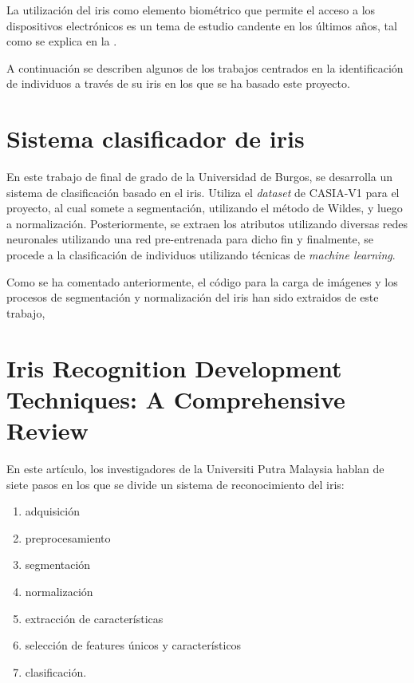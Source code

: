  \label{capitulo6}

La utilización del iris como elemento biométrico que permite el acceso a los dispositivos electrónicos es un tema de estudio candente en los últimos años, 
tal como se explica en la .

A continuación se describen algunos de los trabajos centrados en la identificación de individuos a través de su iris en los que se ha basado este proyecto.

\section{Sistema clasificador de iris}

En este trabajo de final de grado\cite{tfg_iris_2020} de la Universidad de Burgos, se desarrolla un sistema de clasificación basado en el iris. Utiliza el \textit{dataset} 
de CASIA-V1 para el proyecto, al cual somete a segmentación, utilizando el método de Wildes, y luego a normalización. Posteriormente, se extraen los atributos utilizando diversas redes 
neuronales utilizando una red pre-entrenada para dicho fin\cite{lozej_end--end_2018} y finalmente, se procede a la clasificación de individuos utilizando técnicas de \textit{machine learning}.

Como se ha comentado anteriormente, el código para la carga de imágenes y los procesos de segmentación y normalización del iris han sido extraidos de este trabajo,

\section{Iris Recognition Development Techniques: A Comprehensive Review}

En este artículo\cite{malgheet_iris_2021}, los investigadores de la Universiti Putra Malaysia hablan de siete pasos en los que se divide un sistema de reconocimiento del iris:
\begin{enumerate}
\item adquisición
\item preprocesamiento
\item segmentación
\item normalización
\item extracción de características
\item selección de features únicos y característicos
\item clasificación. 
\end{enumerate}
 
